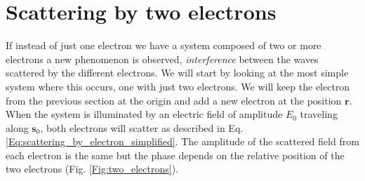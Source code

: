 \section{Scattering by two electrons}\label{scat_two_electrons}

If instead of just one electron we have a system composed of two or more
electrons a new phenomenon is observed, {\em interference} between the waves
scattered by the different electrons. We will start by looking at the most simple
system where this occurs, one with just two electrons. We will keep the electron
from the previous section at the origin and add a new electron at the position
$\mathbf r$. When the system is illuminated by an electric field of amplitude $E_0$
traveling along $\mathbf s_0$, both electrons will scatter as described in
Eq. \ref{Eq:scattering_by_electron_simplified}. The amplitude of the scattered
field from each electron is the same but the phase depends on the relative position of
the two electrons (Fig. \ref{Fig:two_electrons}). 

